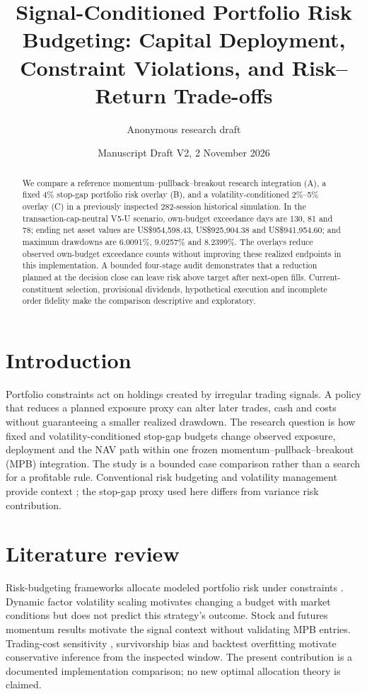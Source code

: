 \documentclass[11pt]{article}
\title{Signal-Conditioned Portfolio Risk Budgeting: Capital Deployment, Constraint Violations, and Risk--Return Trade-offs}
\author{Anonymous research draft}
\date{Manuscript Draft V2, 2 November 2026}
\begin{document}
\maketitle
\begin{abstract}
We compare a reference momentum--pullback--breakout research integration (A), a fixed 4\% stop-gap portfolio risk overlay (B), and a volatility-conditioned 2\%--5\% overlay (C) in a previously inspected 282-session historical simulation. In the transaction-cap-neutral V5-U scenario, own-budget exceedance days are 130, 81 and 78; ending net asset values are US\$954,598.43, US\$925,904.38 and US\$941,954.60; and maximum drawdowns are 6.0091\%, 9.0257\% and 8.2399\%. The overlays reduce observed own-budget exceedance counts without improving these realized endpoints in this implementation. A bounded four-stage audit demonstrates that a reduction planned at the decision close can leave risk above target after next-open fills. Current-constituent selection, provisional dividends, hypothetical execution and incomplete order fidelity make the comparison descriptive and exploratory.
\end{abstract}

\section{Introduction}
Portfolio constraints act on holdings created by irregular trading signals. A policy that reduces a planned exposure proxy can alter later trades, cash and costs without guaranteeing a smaller realized drawdown. The research question is how fixed and volatility-conditioned stop-gap budgets change observed exposure, deployment and the NAV path within one frozen momentum--pullback--breakout (MPB) integration. The study is a bounded case comparison rather than a search for a profitable rule. Conventional risk budgeting and volatility management provide context \citep{Roncalli2014,RichardRoncalli2019,MoreiraMuir2017}; the stop-gap proxy used here differs from variance risk contribution.

\section{Literature review}
Risk-budgeting frameworks allocate modeled portfolio risk under constraints \citep{Roncalli2014,RichardRoncalli2019}. Dynamic factor volatility scaling \citep{MoreiraMuir2017} motivates changing a budget with market conditions but does not predict this strategy's outcome. Stock and futures momentum results \citep{JegadeeshTitman1993,MoskowitzOoiPedersen2012} motivate the signal context without validating MPB entries. Trading-cost sensitivity \citep{NovyMarxVelikov2016}, survivorship bias \citep{BrownGoetzmannIbbotsonRoss1992} and backtest overfitting \citep{BaileyBorweinLopezZhu2017} motivate conservative inference from the inspected window. The present contribution is a documented implementation comparison; no new optimal allocation theory is claimed.
\end{document}
